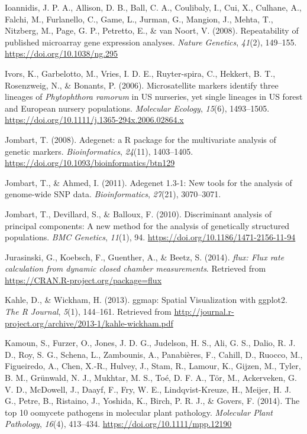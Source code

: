 \documentclass[double,11pt]{beavtex}
\begin{document}
  \hypertarget{ref-ioannidis2008repeatability}{}
  Ioannidis, J. P. A., Allison, D. B., Ball, C. A., Coulibaly, I., Cui,
  X., Culhane, A., Falchi, M., Furlanello, C., Game, L., Jurman, G.,
  Mangion, J., Mehta, T., Nitzberg, M., Page, G. P., Petretto, E., \& van
  Noort, V. (2008). Repeatability of published microarray gene expression
  analyses. \emph{Nature Genetics}, \emph{41}(2), 149--155.
  \url{https://doi.org/10.1038/ng.295}
  
  \hypertarget{ref-ivors2006microsatellite}{}
  Ivors, K., Garbelotto, M., Vries, I. D. E., Ruyter-spira, C., Hekkert,
  B. T., Rosenzweig, N., \& Bonants, P. (2006). Microsatellite markers
  identify three lineages of \emph{Phytophthora ramorum} in US nurseries,
  yet single lineages in US forest and European nursery populations.
  \emph{Molecular Ecology}, \emph{15}(6), 1493--1505.
  \url{https://doi.org/10.1111/j.1365-294x.2006.02864.x}
  
  \hypertarget{ref-Jombart_2008}{}
  Jombart, T. (2008). Adegenet: a R package for the multivariate analysis
  of genetic markers. \emph{Bioinformatics}, \emph{24}(11), 1403--1405.
  \url{https://doi.org/10.1093/bioinformatics/btn129}
  
  \hypertarget{ref-jombart2011adegenet}{}
  Jombart, T., \& Ahmed, I. (2011). Adegenet 1.3-1: New tools for the
  analysis of genome-wide SNP data. \emph{Bioinformatics}, \emph{27}(21),
  3070--3071.
  
  \hypertarget{ref-jombart2010discriminant}{}
  Jombart, T., Devillard, S., \& Balloux, F. (2010). Discriminant analysis
  of principal components: A new method for the analysis of genetically
  structured populations. \emph{BMC Genetics}, \emph{11}(1), 94.
  \url{https://doi.org/10.1186/1471-2156-11-94}
  
  \hypertarget{ref-jurasinski2014flux}{}
  Jurasinski, G., Koebsch, F., Guenther, A., \& Beetz, S. (2014).
  \emph{flux: Flux rate calculation from dynamic closed chamber
  measurements}. Retrieved from
  \url{https://CRAN.R-project.org/package=flux}
  
  \hypertarget{ref-khale2013ggmap}{}
  Kahle, D., \& Wickham, H. (2013). ggmap: Spatial Visualization with
  ggplot2. \emph{The R Journal}, \emph{5}(1), 144--161. Retrieved from
  \url{http://journal.r-project.org/archive/2013-1/kahle-wickham.pdf}
  
  \hypertarget{ref-kamoun2014top}{}
  Kamoun, S., Furzer, O., Jones, J. D. G., Judelson, H. S., Ali, G. S.,
  Dalio, R. J. D., Roy, S. G., Schena, L., Zambounis, A., Panabières, F.,
  Cahill, D., Ruocco, M., Figueiredo, A., Chen, X.-R., Hulvey, J., Stam,
  R., Lamour, K., Gijzen, M., Tyler, B. M., Grünwald, N. J., Mukhtar, M.
  S., Toé, D. F. A., Tör, M., Ackerveken, G. V. D., McDowell, J., Daayf,
  F., Fry, W. E., Lindqvist-Kreuze, H., Meijer, H. J. G., Petre, B.,
  Ristaino, J., Yoshida, K., Birch, P. R. J., \& Govers, F. (2014). The
  top 10 oomycete pathogens in molecular plant pathology. \emph{Molecular
  Plant Pathology}, \emph{16}(4), 413--434.
  \url{https://doi.org/10.1111/mpp.12190}
  
\end{document}
